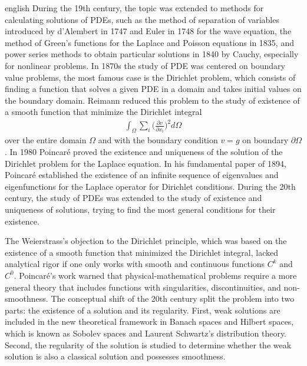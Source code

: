\documentclass[0000.tex]{subfiles}
\begin{document}
\begin{hyphenrules}{english}
During the 19th century, the topic was extended to methods for calculating solutions of PDEs, such as the method of separation of variables introduced by 
d'Alembert in 1747 and Euler in 1748 for the wave equation, the method of Green's functions for the Laplace and Poisson equations in 1835, and power series methods to 
obtain particular solutions in 1840 by Cauchy, especially for nonlinear problems. In 1870s the study of PDE was centered on boundary value problems, the most famous
case is the Dirichlet problem, which consists of finding a function that solves a given PDE in a domain and takes initial values on the boundary domain. Reimann
reduced this problem to the study of existence of a smooth function that minimize the Dirichlet integral
\begin{align*}
    \int_{\Omega} \sum_i \bigg( \frac{\partial v}{\partial x_i}\bigg)^2 d\Omega
\end{align*}
over the entire domain $\Omega$ and with the boundary condition $v = g$ on boundary $\partial\Omega$. In 1980 Poincaré proved the existence and uniqueness of the 
solution of the Dirichlet problem for the Laplace equation. In his fundamental paper of 1894, Poincaré established the existence of an infinite sequence of
eigenvalues and eigenfunctions for the Laplace operator for Dirichlet conditions. During the 20th century, the study of PDEs was extended to the study of existence
and uniqueness of solutions, trying to find the most general conditions for their existence.

The Weierstrass's objection to the Dirichlet principle, which was based on the existence of a smooth function that minimized the Dirichlet integral,
lacked analytical rigor if one only works with smooth and continuous functions $C^k$ and $C^0$. Poincaré's work warned that physical-mathematical problems require
a more general theory that includes functions with singularities, discontinuities, and non-smoothness. The conceptual shift of the 20th century
split the problem into two parts: the existence of a solution and its regularity. First, weak solutions are included in the new theoretical framework in Banach
spaces and Hilbert spaces, which is known as Sobolev spaces and Laurent Schwartz's distribution theory. Second, the regularity of the solution is studied to 
determine whether the weak solution is also a classical solution and possesses smoothness. 


\end{hyphenrules}
\end{document}
